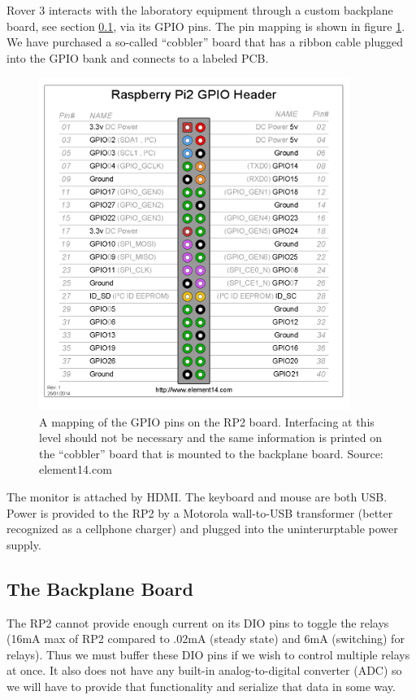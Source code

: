 \documentclass{article}
\begin{document}
Rover 3 interacts with the laboratory equipment through a custom backplane board, see section \ref{sect:backplane}, via its GPIO pins. The pin mapping is shown in figure \ref{fig:gpioPinMapping}. We have purchased a so-called ``cobbler'' board that has a ribbon cable plugged into the GPIO bank and connects to a labeled PCB.

\begin{figure}
\centering
\includegraphics[width=0.9\textwidth]{rp2PinMapping.png}
\caption{A mapping of the GPIO pins on the RP2 board. Interfacing at this level should not be necessary and the same information is printed on the ``cobbler'' board that is mounted to the backplane board. Source: element14.com}
\label{fig:gpioPinMapping}
\end{figure}

The monitor is attached by HDMI. The keyboard and mouse are both USB. Power is provided to the RP2 by a Motorola wall-to-USB transformer (better recognized as a cellphone charger) and plugged into the uninterurptable power supply.


\subsection{The Backplane Board}
\label{sect:backplane}
The RP2 cannot provide enough current on its DIO pins to toggle the relays (16mA max of RP2 compared to .02mA (steady state) and 6mA (switching) for relays). Thus we must buffer these DIO pins if we wish to control multiple relays at once. It also does not have any built-in analog-to-digital converter (ADC) so we will have to provide that functionality and serialize that data in some way. 
\end{document}
